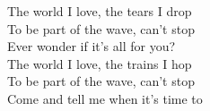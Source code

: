 The world I love, the tears I drop \\
To be part of the wave, can't stop \\
Ever wonder if it's all for you? \\

The world I love, the trains I hop \\
To be part of the wave, can't stop \\
Come and tell me when it's time to \\
